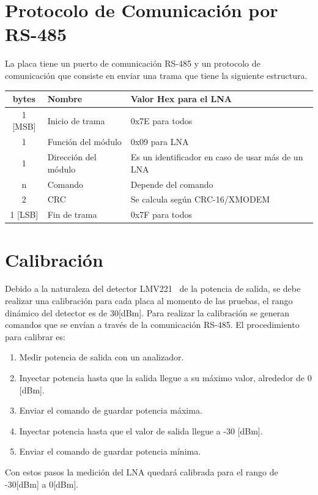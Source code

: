 \documentclass[12pt,twoside,onecolumn]{article}
\begin{document}
\newpage
\section{Protocolo de Comunicación por RS-485}\label{sec:rs485}
La placa tiene un puerto de comunicación RS-485 y un protocolo de comunicación que consiste en enviar una trama que tiene la siguiente estructura.
\begin{center}
\begin{tabular}{||c | l | l||} 
 \hline
 bytes & Nombre & Valor Hex para el LNA \\ [0.5ex] 
 \hline\hline
 1 [MSB] &  Inicio de trama & 0x7E para todos\\ 
 \hline
 1 &  Función del módulo & 0x09 para LNA \\
 \hline
 1 &  Dirección del módulo & Es un identificador en caso de usar más de un LNA \\ 
 \hline
 n &  Comando  & Depende del comando \\
 \hline
 2 &  CRC  & Se calcula según CRC-16/XMODEM~\cite{web:crc} \\
 \hline
 1 [LSB]&  Fin de trama & 0x7F para todos \\
 \hline
 \hline
\end{tabular}
\end{center}

\section{Calibración}
Debido a la naturaleza del detector LMV221~\cite{web:lmv221} de la potencia de salida, se debe realizar una calibración para cada placa al momento de las pruebas, el rango dinámico del detector es de 30[dBm]. Para realizar la calibración se generan comandos que se envían a través de la comunicación RS-485. El procedimiento para calibrar es: 
\begin{enumerate}
\setlength\itemsep{-0.1em}
    \item Medir potencia de salida con un analizador.
    \item Inyectar potencia hasta que la salida llegue a su máximo valor, alrededor de 0 [dBm].
    \item Enviar el comando de guardar potencia máxima.
    \item Inyectar potencia hasta que el valor de salida llegue a -30 [dBm].
    \item Enviar el comando de guardar potencia mínima. 
\end{enumerate}
Con estos pasos la medición del LNA quedará calibrada para el rango de -30[dBm] a 0[dBm].
\end{document}
